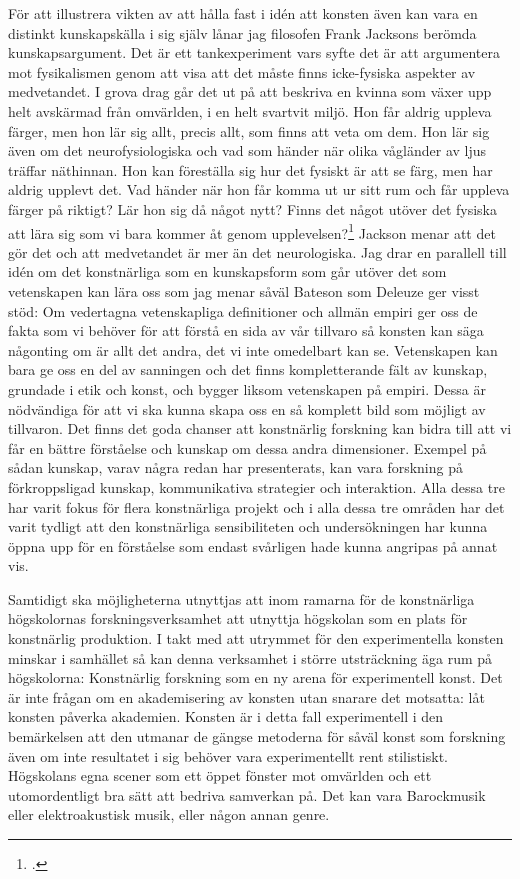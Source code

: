 \documentclass[11pt]{article}
\begin{document}
För att illustrera vikten av att hålla fast i idén att konsten även
kan vara en distinkt kunskapskälla i sig själv lånar jag filosofen
Frank Jacksons berömda kunskapsargument. Det är ett tankexperiment
vars syfte det är att argumentera mot fysikalismen genom att visa att
det måste finns icke-fysiska aspekter av medvetandet. I grova drag går
det ut på att beskriva en kvinna som växer upp helt avskärmad från
omvärlden, i en helt svartvit miljö. Hon får aldrig uppleva färger,
men hon lär sig allt, precis allt, som finns att veta om dem. Hon lär
sig även om det neurofysiologiska och vad som händer när olika
vågländer av ljus träffar näthinnan. Hon kan föreställa sig hur det
fysiskt är att se färg, men har aldrig upplevt det. Vad händer när hon
får komma ut ur sitt rum och får uppleva färger på riktigt?  Lär hon
sig då något nytt? Finns det något utöver det fysiska att lära sig som
vi bara kommer åt genom upplevelsen?\footcite[s.130]{Jackson1982}
Jackson menar att det gör det och att medvetandet är mer än det
neurologiska. Jag drar en parallell till idén om det konstnärliga som
en kunskapsform som går utöver det som vetenskapen kan lära oss som
jag menar såväl Bateson som Deleuze ger visst stöd: Om vedertagna
vetenskapliga definitioner och allmän empiri ger oss de fakta som vi
behöver för att förstå en sida av vår tillvaro så konsten kan säga
någonting om är allt det andra, det vi inte omedelbart kan
se. Vetenskapen kan bara ge oss en del av sanningen och det finns
kompletterande fält av kunskap, grundade i etik och konst, och bygger
liksom vetenskapen på empiri. Dessa är nödvändiga för att vi ska kunna
skapa oss en så komplett bild som möjligt av tillvaron. Det finns det
goda chanser att konstnärlig forskning kan bidra till att vi får en
bättre förståelse och kunskap om dessa andra dimensioner. Exempel på
sådan kunskap, varav några redan har presenterats, kan vara forskning
på förkroppsligad kunskap, kommunikativa strategier och
interaktion. Alla dessa tre har varit fokus för flera konstnärliga
projekt och i alla dessa tre områden har det varit tydligt att den
konstnärliga sensibiliteten och undersökningen har kunna öppna upp för
en förståelse som endast svårligen hade kunna angripas på annat vis.

Samtidigt ska möjligheterna utnyttjas att inom ramarna för de
konstnärliga högskolornas forskningsverksamhet att utnyttja högskolan
som en plats för konstnärlig produktion. I takt med att utrymmet för
den experimentella konsten minskar i samhället så kan denna verksamhet
i större utsträckning äga rum på högskolorna: Konstnärlig forskning
som en ny arena för experimentell konst. Det är inte frågan om en
akademisering av konsten utan snarare det motsatta: låt konsten
påverka akademien. Konsten är i detta fall experimentell i den
bemärkelsen att den utmanar de gängse metoderna för såväl konst som
forskning även om inte resultatet i sig behöver vara experimentellt
rent stilistiskt. Högskolans egna scener som ett öppet fönster mot
omvärlden och ett utomordentligt bra sätt att bedriva samverkan på.
Det kan vara Barockmusik eller elektroakustisk musik, eller någon
annan genre.
\end{document}
